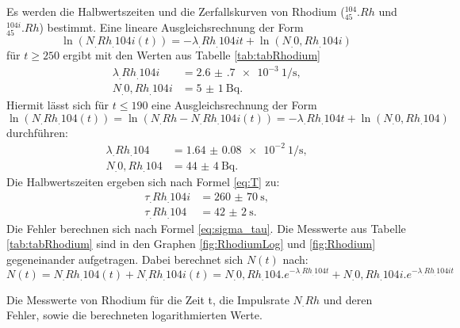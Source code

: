 Es werden die Halbwertszeiten und die Zerfallskurven von Rhodium ($^{104}_{45}.{Rh}$ und $^{104i}_{45}.{Rh}$) bestimmt.
Eine lineare Ausgleichsrechnung der Form 
\begin{equation}
\ln(N_.{Rh_.{104i}}(t))=-\lambda_.{Rh_.{104i}} t+\ln(N_.{0,Rh_.{104i}})\label{eq:Ausgleich2}
\end{equation}
für $t\geq 250$ ergibt mit den Werten aus Tabelle \ref{tab:tabRhodium}
\begin{align*}
\lambda_.{Rh_.{104i}} 	&= \SI{2.6(7)e-3}{1\per\second}\text{,}\\
N_.{0,Rh_.{104i}} 		&= \SI{5(1)}{\becquerel}\text{.}
\end{align*}
Hiermit lässt sich für $t\leq 190$ eine Ausgleichsrechnung der Form 
\begin{equation}
\ln(N_.{Rh_.{104}}(t))=\ln(N_.{Rh}-N_.{Rh_.{104i}}(t))=-\lambda_.{Rh_.{104}} t+\ln(N_.{0,Rh_.{104}})\label{eq:Ausgleich1}
\end{equation}
durchführen:
\begin{align*}
\lambda_.{Rh_.{104}} 	&= \SI{1.64(8)e-2}{1\per\second}\text{,}\\
N_.{0,Rh_.{104}} 		&= \SI{44(4)}{\becquerel}\text{.}
\end{align*}
Die Halbwertszeiten ergeben sich nach Formel \eqref{eq:T} zu:
\begin{align*}
\tau_.{Rh_.{104i}} 	&= \SI{260(70)}{\second}\text{,}\\
\tau_.{Rh_.{104}} &= \SI{42(2)}{\second}\text{.}
\end{align*}
Die Fehler berechnen sich nach Formel \eqref{eq:sigma_tau}. Die Messwerte aus Tabelle \ref{tab:tabRhodium} sind in den Graphen \ref{fig:RhodiumLog} und \ref{fig:Rhodium} gegeneinander aufgetragen. Dabei berechnet sich $N(t)$ nach:
\begin{equation*}
N(t)=N_.{Rh_.{104}}(t)+N_.{Rh_.{104i}}(t)=N_.{0,Rh_.{104}}.e^{-\lambda_.{Rh_.{104}} t}+N_.{0,Rh_.{104i}}.e^{-\lambda_.{Rh_.{104i}} t}
\end{equation*}

\begin{table}
	\centering
	\caption{Die Messwerte von Rhodium für die Zeit t, die Impulsrate $N_.{Rh}$ und deren Fehler, sowie die berechneten logarithmierten Werte.}
	
	\label{tab:tabRhodium}
\end{table}

\begin{table}
	\centering
	
\end{table}

